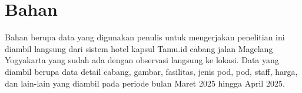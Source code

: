 \section{Bahan}

Bahan berupa data yang digunakan penulis untuk mengerjakan penelitian ini diambil langsung dari sistem hotel kapsul Tamu.id cabang jalan Magelang Yogyakarta yang sudah ada dengan observasi langsung ke lokasi. Data yang diambil berupa data detail cabang, gambar, fasilitas, jenis pod, pod, staff, harga, dan lain-lain yang diambil pada periode bulan Maret 2025 hingga April 2025.